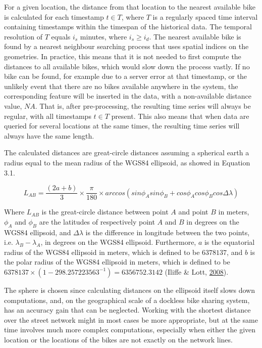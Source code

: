 \documentclass[12pt,oneside]{reedthesis}
\begin{document}
For a given location, the distance from that location to the nearest
available bike is calculated for each timestamp \(t \in T\), where \(T\)
is a regularly spaced time interval containing timestamps within the
timespan of the historical data. The temporal resolution of \(T\) equals
\(i_{s}\) minutes, where \(i_{s} \geq i_{d}\). The nearest available
bike is found by a nearest neighbour searching process that uses spatial
indices on the geometries. In practice, this means that it is not needed
to first compute the distances to all available bikes, which would slow
down the process vastly. If no bike can be found, for example due to a
server error at that timestamp, or the unlikely event that there are no
bikes available anywhere in the system, the corresponding feature will
be inserted in the data, with a non-available distance value, \(NA\).
That is, after pre-processing, the resulting time series will always be
regular, with all timestamps \(t \in T\) present. This also means that
when data are queried for several locations at the same times, the
resulting time series will always have the same length.

The calculated distances are great-circle distances assuming a spherical
earth a radius equal to the mean radius of the WGS84 ellipsoid, as
showed in Equation 3.1.

\[
L_{AB} = \frac{(2a+b)}{3} \times
\frac{\pi}{180} \times
arccos(sin\phi_{A}sin\phi_{B}+cos\phi_{A}cos\phi_{B}cos\Delta\lambda)
\]

Where \(L_{AB}\) is the great-circle distance between point \(A\) and
point \(B\) in meters, \(\phi_{A}\) and \(\phi_{B}\) are the latitudes
of respectively point \(A\) and \(B\) in degrees on the WGS84 ellipsoid,
and \(\Delta\lambda\) is the difference in longitude between the two
points, i.e. \(\lambda_{B}-\lambda_{A}\), in degrees on the WGS84
ellipsoid. Furthermore, \(a\) is the equatorial radius of the WGS84
ellipsoid in meters, which is defined to be \(6378137\), and \(b\) is
the polar radius of the WGS84 ellipsoid in meters, which is defined to
be \(6378137 \times (1 - 298.257 223 563^{-1}) = 6 356 752.3142\)
(Iliffe \& Lott, \protect\hyperlink{ref-iliffe2008}{2008}).

The sphere is chosen since calculating distances on the ellipsoid itself
slows down computations, and, on the geographical scale of a dockless
bike sharing system, has an accuracy gain that can be neglected. Working
with the shortest distance over the street network might in most cases
be more appropriate, but at the same time involves much more complex
computations, especially when either the given location or the locations
of the bikes are not exactly on the network lines.
\end{document}

